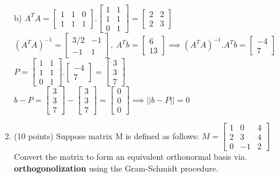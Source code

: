 \documentclass{article}%
\begin{document}
\begin{enumerate}
    b) $A^TA = \begin{bmatrix} 1 & 1 & 0 \\ 1 & 1 & 1 \end{bmatrix} . \begin{bmatrix} 1 & 1 \\ 1 & 1 \\ 0 & 1 \end{bmatrix} = \begin{bmatrix} 2 & 2 \\ 2 & 3 \end{bmatrix} $ \\
    $ (A^TA)^{-1} = \begin{bmatrix} 3/2 & -1 \\ -1 & 1 \end{bmatrix}, \ A^Tb = \begin{bmatrix} 6 \\ 13 \end{bmatrix} \implies (A^TA)^{-1}.A^Tb = \begin{bmatrix} -4 \\ 7 \end{bmatrix} $ \\
    $P = \begin{bmatrix} 1 & 1 \\ 1 & 1 \\ 0 & 1 \end{bmatrix} . \begin{bmatrix} -4 \\ 7 \end{bmatrix} = \begin{bmatrix} 3 \\ 3 \\ 7 \end{bmatrix}$ \\
    $b - P = \begin{bmatrix} 3 \\ 3 \\ 7 \end{bmatrix} - \begin{bmatrix} 3 \\ 3 \\ 7 \end{bmatrix} = \begin{bmatrix} 0 \\ 0 \\ 0 \end{bmatrix} \implies ||b - P|| = 0 $


    \item (10 points) Suppose matrix M is defined as follows:
    $M = \begin{bmatrix}
            1 & 0 & 4\\
            2 & 3 & 4\\
            0 & -1 & 2
        \end{bmatrix}$
    Convert the matrix to form an equivalent orthonormal basis via. \textbf{orthogonolization} using the Gram-Schmidt procedure.


\end{enumerate}
\end{document}
